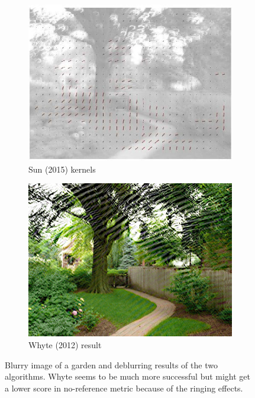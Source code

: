\documentclass[10pt,twocolumn,letterpaper]{article}
\begin{document}
\begin{figure}
\begin{center}
\begin{subfigure}{0.45\textwidth}
\includegraphics[width=0.9\linewidth]{garden_kernels}
\caption{Sun \etal (2015) kernels}
\label{fig:subim7}
\end{subfigure}
\begin{subfigure}{0.45\textwidth}
\graphicspath{ {deblurwhyte/} }
\includegraphics[width=0.9\linewidth]{garden_whyte}
\caption{Whyte \etal (2012) result}
\label{fig:subim6}
\end{subfigure}
 
\caption{Blurry image of a garden and deblurring results of the two algorithms. Whyte seems to be much more successful but might get a lower score in no-reference metric because of the ringing effects.}
\label{fig:image3}
\end{center}
\end{figure}
\end{document}
